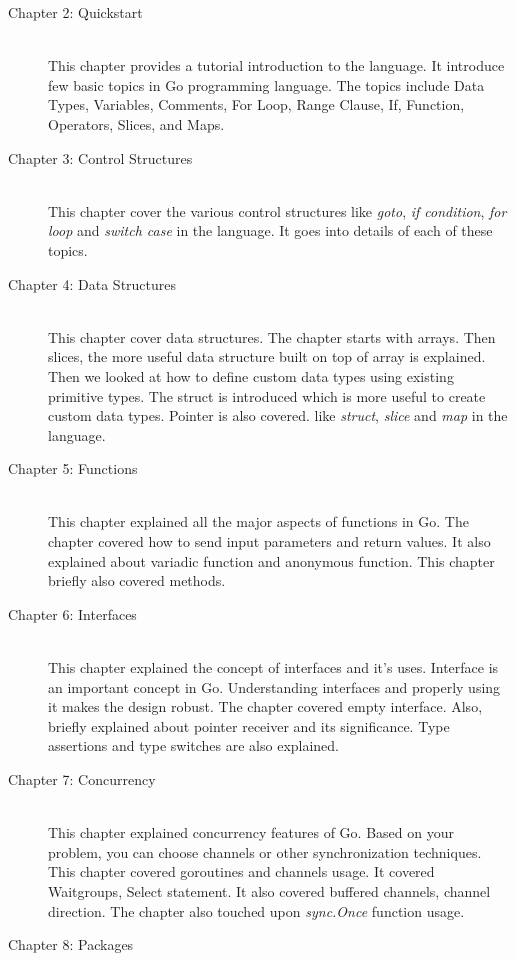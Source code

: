 \begin{description}
\item[Chapter 2: Quickstart] \hfill \\
This chapter provides a tutorial introduction to the language. It introduce few
basic topics in Go programming language. The topics include Data Types,
Variables, Comments, For Loop, Range Clause, If, Function, Operators, Slices,
and Maps.
\item[Chapter 3: Control Structures] \hfill \\
This chapter cover the various control structures like \textit{goto}, \textit{if
condition}, \textit{for loop} and \textit{switch case} in the language. It goes
into details of each of these topics.
\item[Chapter 4: Data Structures] \hfill \\
This chapter cover data structures. The chapter starts with arrays. Then slices,
the more useful data structure built on top of array is explained. Then we
looked at how to define custom data types using existing primitive types. The
struct is introduced which is more useful to create custom data types. Pointer
is also covered. like \textit{struct}, \textit{slice} and \textit{map} in the
language.
\item[Chapter 5: Functions] \hfill \\
This chapter explained all the major aspects of functions in Go. The chapter
covered how to send input parameters and return values. It also explained about
variadic function and anonymous function. This chapter briefly also covered
methods.
\item[Chapter 6: Interfaces] \hfill \\
This chapter explained the concept of interfaces and it's uses. Interface is an
important concept in Go. Understanding interfaces and properly using it makes
the design robust. The chapter covered empty interface. Also, briefly explained
about pointer receiver and its significance. Type assertions and type switches
are also explained.
\item[Chapter 7: Concurrency] \hfill \\
This chapter explained concurrency features of Go. Based on your problem, you
can choose channels or other synchronization techniques. This chapter covered
goroutines and channels usage. It covered Waitgroups, Select statement. It also
covered buffered channels, channel direction. The chapter also touched
upon \textit{sync.Once} function usage.
\item[Chapter 8: Packages] \hfill \\

\end{description}
